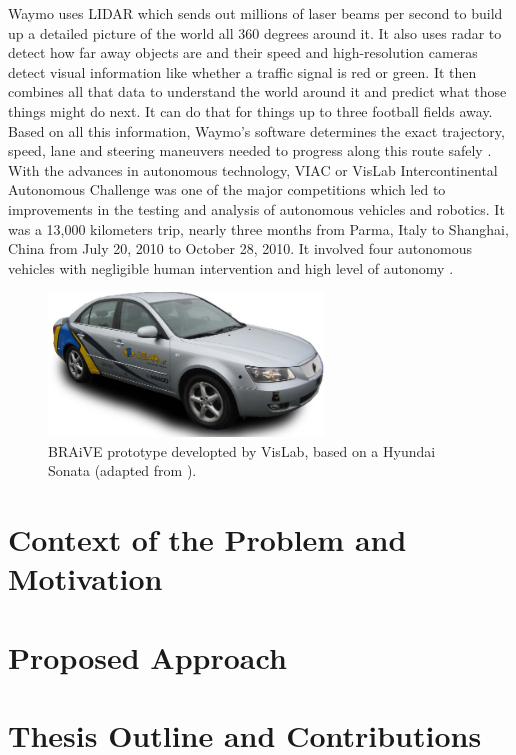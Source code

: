 Waymo uses LIDAR which sends out millions of laser beams per second to build up a detailed picture of the world all 360 degrees around it. It also uses radar to detect how far away objects are and their speed and high-resolution cameras detect visual information like whether a traffic signal is red or green. It then combines all that data to understand the world around it and predict what those things might do next. It can do that for things up to three football fields away. Based on all this information, Waymo's software determines the exact trajectory, speed, lane and steering maneuvers needed to progress along this route safely \cite{waymoh} \cite{waymot}.
With the advances in autonomous technology, VIAC or VisLab Intercontinental Autonomous Challenge was one of the major competitions which led to improvements in the testing and analysis of autonomous vehicles and robotics. It was a 13,000 kilometers trip, nearly three months from Parma, Italy to Shanghai, China from July 20, 2010 to October 28, 2010. It involved four autonomous vehicles with negligible human intervention and high level of autonomy \cite{Broggi2010}.
\begin{figure}[!h]
	\centering
	\includegraphics[width=0.65\textwidth]{../figure/veiculos4.png}
	\caption{BRAiVE prototype developted by VisLab, based on a Hyundai Sonata (adapted from \cite{Broggi2013}).}
	\label{fig:veiculos4}
\end{figure}
\section{Context of the Problem and Motivation}
\section{Proposed Approach}
\section{Thesis Outline and Contributions}